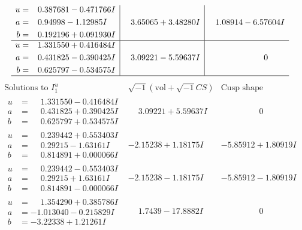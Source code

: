 \documentclass[1p]{elsarticle_modified}
\theoremstyle{definition}
\newcommand{\I}{\sqrt{-1}}
\begin{document}
$$\begin{array}{c|c|c}
\begin{aligned}
u &= \phantom{-}0.387681 - 0.471766 I \\
a &= \phantom{-}0.94998 - 1.12985 I \\
b &= \phantom{-}0.192196 + 0.091930 I\end{aligned}
 & \phantom{-}3.65065 + 3.48280 I & \phantom{-}1.08914 - 6.57604 I \\ \hline\begin{aligned}
u &= \phantom{-}1.331550 + 0.416484 I \\
a &= \phantom{-}0.431825 - 0.390425 I \\
b &= \phantom{-}0.625797 - 0.534575 I\end{aligned}
 & \phantom{-}3.09221 - 5.59637 I & \phantom{-0.000000 } 0\\
 \hline 
 \end{array}$$\newpage$$\begin{array}{c|c|c}  
\text{Solutions to }I^u_{1}& \I (\text{vol} + \sqrt{-1}CS) & \text{Cusp shape}\\
 \hline 
\begin{aligned}
u &= \phantom{-}1.331550 - 0.416484 I \\
a &= \phantom{-}0.431825 + 0.390425 I \\
b &= \phantom{-}0.625797 + 0.534575 I\end{aligned}
 & \phantom{-}3.09221 + 5.59637 I & \phantom{-0.000000 } 0 \\ \hline\begin{aligned}
u &= \phantom{-}0.239442 + 0.553403 I \\
a &= \phantom{-}0.29215 - 1.63161 I \\
b &= \phantom{-}0.814891 + 0.000066 I\end{aligned}
 & -2.15238 + 1.18175 I & -5.85912 + 1.80919 I \\ \hline\begin{aligned}
u &= \phantom{-}0.239442 - 0.553403 I \\
a &= \phantom{-}0.29215 + 1.63161 I \\
b &= \phantom{-}0.814891 - 0.000066 I\end{aligned}
 & -2.15238 - 1.18175 I & -5.85912 - 1.80919 I \\ \hline\begin{aligned}
u &= \phantom{-}1.354290 + 0.385786 I \\
a &= -1.013040 - 0.215829 I \\
b &= -3.22338 + 1.21261 I\end{aligned}
 & \phantom{-}1.7439 - 17.8882 I & \phantom{-0.000000 } 0 \\ \hline\begin{aligned}

\end{aligned}
\end{array}$$
\end{document}
